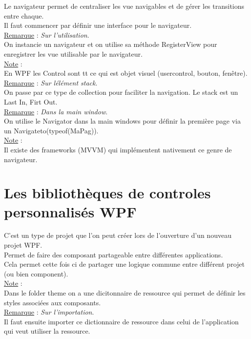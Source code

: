 \documentclass[a4paper,12pt,twoside]{article}
\newcommand{\rem}[2]{\noindent\underline{Remarque} : \textit{#1}.\\ \indent #2}
\newcommand{\note}[1]{\noindent\underline{Note} : \\ \indent #1}
\begin{document}
Le navigateur permet de centraliser les vue navigables et de gérer les transitions entre chaque.\\
Il faut commencer par définir une interface pour le navigateur.\\

\rem{Sur l'utilisation}{On instancie un navigateur et on utilise sa méthode RegisterView pour enregistrer les vue utilisable par le navigateur.}\\

\note{En WPF les Control sont tt ce qui est objet visuel (usercontrol, bouton, fenêtre).}\\

\rem{Sur lélément stack}{On passe par ce type de collection pour faciliter la navigation. Le stack est un Last In, Firt Out.}\\

\rem{Dans la main window}{On utilise le Navigator dans la main windows pour définir la première page via un Navigateto(typeof(MaPag)).}\\

\note{Il existe des frameworks (MVVM) qui implémentent nativement ce genre de navigateur.}\\

\section{Les bibliothèques de controles personnalisés WPF}

C'est un type de projet que l'on peut créer lors de l'ouverture d'un nouveau projet WPF.\\
Permet de faire des composant partageable entre différentes applications.\\
Cela permet cette fois ci de partager une logique commune entre différent projet (ou bien component).\\

\note{Dans le folder theme on a une dicitonnaire de ressource qui permet de définir les styles associées aux composants.}\\

\rem{Sur l'importation}{Il faut ensuite importer ce dictionnaire de ressource dans celui de l'application qui veut utiliser la ressource.}\\



\end{document}
